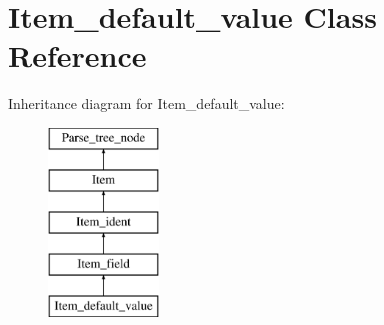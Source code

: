 \hypertarget{classItem__default__value}{}\section{Item\+\_\+default\+\_\+value Class Reference}
\label{classItem__default__value}
Inheritance diagram for Item\+\_\+default\+\_\+value\+:\begin{figure}[H]
\begin{center}
\leavevmode
\includegraphics[height=5.000000cm]{classItem__default__value}
\end{center}
\end{figure}
